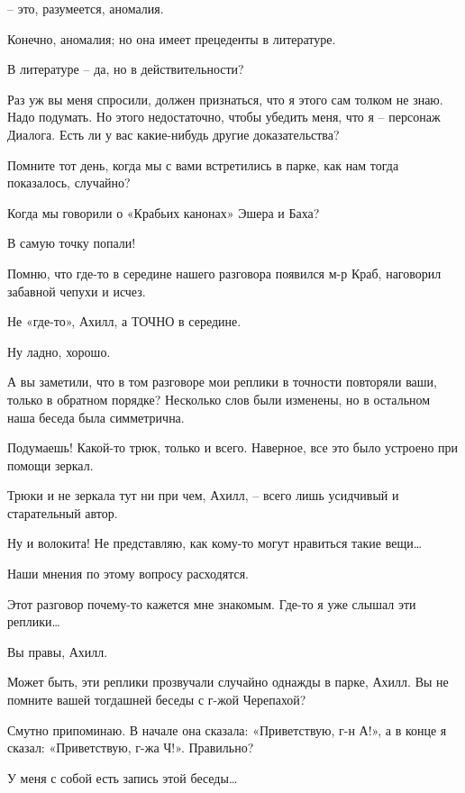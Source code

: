 \documentclass[../main.tex]{subfiles}
\begin{document}
\begin{dialogue}
 \--- это, разумеется, аномалия.

 Конечно, аномалия; но она имеет прецеденты в литературе.

 В литературе \--- да, но в действительности?

 Раз уж вы меня спросили, должен признаться, что я этого сам толком не знаю. Надо подумать. Но этого недостаточно, чтобы убедить меня, что я \--- персонаж Диалога. Есть ли у вас какие-нибудь другие доказательства?

 Помните тот день, когда мы с вами встретились в парке, как нам тогда показалось, случайно?

 Когда мы говорили о «Крабьих канонах» Эшера и Баха?

 В самую точку попали!

 Помню, что где-то в середине нашего разговора появился м-р Краб, наговорил забавной чепухи и исчез.

 Не «где-то», Ахилл, а ТОЧНО в середине.

 Ну ладно, хорошо.

 А вы заметили, что в том разговоре мои реплики в точности повторяли ваши, только в обратном порядке? Несколько слов были изменены, но в остальном наша беседа была симметрична.

 Подумаешь! Какой-то трюк, только и всего. Наверное, все это было устроено при помощи зеркал.

 Трюки и не зеркала тут ни при чем, Ахилл, \--- всего лишь усидчивый и старательный автор.

 Ну и волокита! Не представляю, как кому-то могут нравиться такие вещи\ldots{}

 Наши мнения по этому вопросу расходятся.

 Этот разговор почему-то кажется мне знакомым. Где-то я уже слышал эти реплики\ldots{}

 Вы правы, Ахилл.

 Может быть, эти реплики прозвучали случайно однажды в парке, Ахилл. Вы не помните вашей тогдашней беседы с г-жой Черепахой?

 Смутно припоминаю. В начале она сказала: «Приветствую, г-н А!», а в конце я сказал: «Приветствую, г-жа Ч!». Правильно?

 У меня с собой есть запись этой беседы\ldots{}


\end{dialogue}
\end{document}
